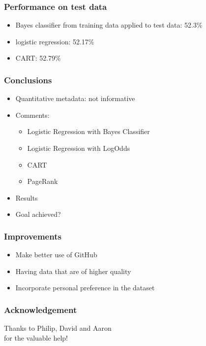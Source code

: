 \documentclass[fleqn]{beamer}
\begin{document}
\begin{frame}
\frametitle{Performance on test data}
    \begin{itemize}
        \item Bayes classifier from training data applied to test data: 52.3\%
        \item logistic regression: 52.17\%
        \item CART: 52.79\%
    \end{itemize}

\end{frame}

\begin{frame}
\frametitle{Conclusions}
    \begin{itemize}
        \item Quantitative metadata: not informative
        \item Comments: 
        	\begin{itemize}
	   \item Logistic Regression with Bayes Classifier
	   \item Logistic Regression with LogOdds
	   \item CART
	   \item PageRank
	\end{itemize}
       \item Results
       \item Goal achieved?
    \end{itemize}

\end{frame}

\begin{frame}
\frametitle{Improvements}
   \begin{itemize}
      \item Make better use of GitHub
      \item Having data that are of higher quality
      \item Incorporate personal preference in the dataset 
   \end{itemize}
\end{frame}

\begin{frame}
\frametitle{Acknowledgement}
\begin{center}
Thanks to Philip, David and Aaron\\
for the valuable help!
\end{center}
   
\end{frame}
\end{document}
